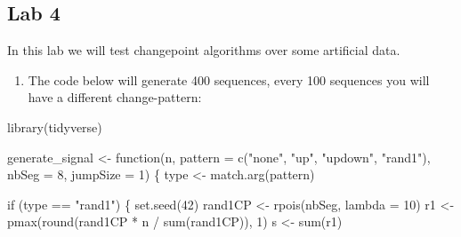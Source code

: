 \documentclass[
  letterpaper,
  DIV=11,
  numbers=noendperiod]{scrreprt}
\newenvironment{Shaded}{\begin{snugshade}}{\end{snugshade}}
\newcommand{\AttributeTok}[1]{\textcolor[rgb]{0.40,0.45,0.13}{#1}}
\newcommand{\ControlFlowTok}[1]{\textcolor[rgb]{0.00,0.23,0.31}{#1}}
\newcommand{\DecValTok}[1]{\textcolor[rgb]{0.68,0.00,0.00}{#1}}
\newcommand{\FunctionTok}[1]{\textcolor[rgb]{0.28,0.35,0.67}{#1}}
\newcommand{\NormalTok}[1]{\textcolor[rgb]{0.00,0.23,0.31}{#1}}
\newcommand{\OtherTok}[1]{\textcolor[rgb]{0.00,0.23,0.31}{#1}}
\newcommand{\SpecialCharTok}[1]{\textcolor[rgb]{0.37,0.37,0.37}{#1}}
\newcommand{\StringTok}[1]{\textcolor[rgb]{0.13,0.47,0.30}{#1}}
\providecommand{\tightlist}{%
  \setlength{\itemsep}{0pt}\setlength{\parskip}{0pt}}\usepackage{longtable,booktabs,array}
\begin{document}
\subsection{Lab 4}\label{lab-4}

In this lab we will test changepoint algorithms over some artificial
data.

\begin{enumerate}
\def\labelenumi{\arabic{enumi}.}
\tightlist
\item
  The code below will generate 400 sequences, every 100 sequences you
  will have a different change-pattern:
\end{enumerate}

\begin{Shaded}
\begin{Highlighting}[]
\FunctionTok{library}\NormalTok{(tidyverse)}

\NormalTok{generate\_signal }\OtherTok{\textless{}{-}} \ControlFlowTok{function}\NormalTok{(n, }\AttributeTok{pattern =} \FunctionTok{c}\NormalTok{(}\StringTok{"none"}\NormalTok{, }\StringTok{"up"}\NormalTok{, }\StringTok{"updown"}\NormalTok{, }\StringTok{"rand1"}\NormalTok{), }\AttributeTok{nbSeg =} \DecValTok{8}\NormalTok{, }\AttributeTok{jumpSize =} \DecValTok{1}\NormalTok{) \{}
\NormalTok{  type }\OtherTok{\textless{}{-}} \FunctionTok{match.arg}\NormalTok{(pattern)}

  \ControlFlowTok{if}\NormalTok{ (type }\SpecialCharTok{==} \StringTok{"rand1"}\NormalTok{) \{}
    \FunctionTok{set.seed}\NormalTok{(}\DecValTok{42}\NormalTok{)}
\NormalTok{    rand1CP }\OtherTok{\textless{}{-}} \FunctionTok{rpois}\NormalTok{(nbSeg, }\AttributeTok{lambda =} \DecValTok{10}\NormalTok{)}
\NormalTok{    r1 }\OtherTok{\textless{}{-}} \FunctionTok{pmax}\NormalTok{(}\FunctionTok{round}\NormalTok{(rand1CP }\SpecialCharTok{*}\NormalTok{ n }\SpecialCharTok{/} \FunctionTok{sum}\NormalTok{(rand1CP)), }\DecValTok{1}\NormalTok{)}
\NormalTok{    s }\OtherTok{\textless{}{-}} \FunctionTok{sum}\NormalTok{(r1)}


\end{Highlighting}
\end{Shaded}
\end{document}
